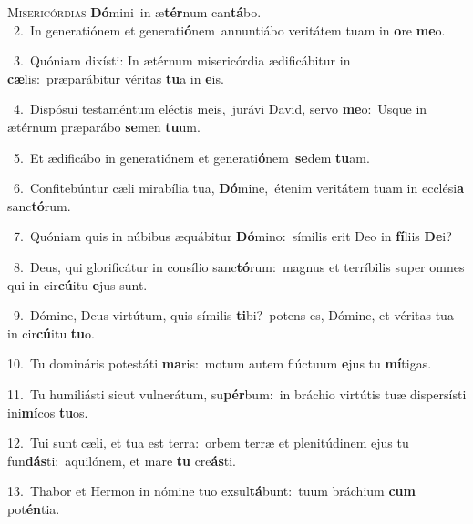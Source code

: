 \lettrine{\initial\textcolor{\initialcolor}{M}}{isericórdias} \textbf{Dó}\-mini~\star in æ\-\textbf{tér}\-num can\-\textbf{tá}\-bo.\\
{\numbfont\textcolor{\numbcolor}{~2.}}~In generatiónem et generati\-\textbf{ó}\-nem~\star annuntiábo veritátem tuam in \textbf{o}\-re \textbf{me}\-o.\par
{\numbfont\textcolor{\numbcolor}{~3.}}~Quóniam dixísti: In ætérnum misericórdia ædificábitur in \textbf{cæ}\-lis:~\star præparábitur véritas \textbf{tu}\-a in \textbf{e}\-is.\par
{\numbfont\textcolor{\numbcolor}{~4.}}~Dispósui testaméntum eléctis meis,~\dagger jurávi David, servo \textbf{me}\-o:~\star Usque in ætérnum præparábo \textbf{se}\-men \textbf{tu}\-um.\par
{\numbfont\textcolor{\numbcolor}{~5.}}~Et ædificábo in generatiónem et generati\-\textbf{ó}\-nem~\star \textbf{se}\-dem \textbf{tu}\-am.\par
{\numbfont\textcolor{\numbcolor}{~6.}}~Confitebúntur cæli mirabília tua, \textbf{Dó}\-mine,~\star étenim veritátem tuam in ecclési\textbf{a} sanc\-\textbf{tó}\-rum.\par
{\numbfont\textcolor{\numbcolor}{~7.}}~Quóniam quis in núbibus æquábitur \textbf{Dó}\-mino:~\star símilis erit Deo in \textbf{fí}\-liis \textbf{De}\-i?\par
{\numbfont\textcolor{\numbcolor}{~8.}}~Deus, qui glorificátur in consílio sanc\-\textbf{tó}\-rum:~\star magnus et terríbilis super omnes qui in cir\-\textbf{cú}\-itu \textbf{e}\-jus sunt.\par
{\numbfont\textcolor{\numbcolor}{~9.}}~Dómine, Deus virtútum, quis símilis \textbf{ti}\-bi?~\star potens es, Dómine, et véritas tua in cir\-\textbf{cú}\-itu \textbf{tu}\-o.\par
{\numbfont\textcolor{\numbcolor}{10.}}~Tu domináris potestáti \textbf{ma}\-ris:~\star motum autem flúctuum \textbf{e}\-jus tu \textbf{mí}\-tigas.\par
{\numbfont\textcolor{\numbcolor}{11.}}~Tu humiliásti sicut vulnerátum, su\-\textbf{pér}\-bum:~\star in bráchio virtútis tuæ dispersísti ini\-\textbf{mí}\-cos \textbf{tu}\-os.\par
{\numbfont\textcolor{\numbcolor}{12.}}~Tui sunt cæli, et tua est terra:~\dagger orbem terræ et plenitúdinem ejus tu fun\-\textbf{dás}\-ti:~\star aquilónem, et mare \textbf{tu} cre\-\textbf{ás}\-ti.\par
{\numbfont\textcolor{\numbcolor}{13.}}~Thabor et Hermon in nómine tuo exsul\-\textbf{tá}\-bunt:~\star tuum bráchium \textbf{cum} pot\-\textbf{én}\-tia.\par
